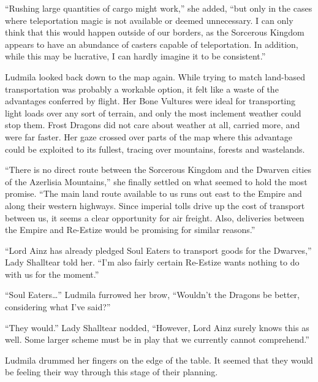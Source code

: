  

“Rushing large quantities of cargo might work,” she added, “but only in the cases where teleportation magic is not available or deemed unnecessary. I can only think that this would happen outside of our borders, as the Sorcerous Kingdom appears to have an abundance of casters capable of teleportation. In addition, while this may be lucrative, I can hardly imagine it to be consistent.”

 

Ludmila looked back down to the map again. While trying to match land-based transportation was probably a workable option, it felt like a waste of the advantages conferred by flight. Her Bone Vultures were ideal for transporting light loads over any sort of terrain, and only the most inclement weather could stop them. Frost Dragons did not care about weather at all, carried more, and were far faster. Her gaze crossed over parts of the map where this advantage could be exploited to its fullest, tracing over mountains, forests and wastelands.

 

“There is no direct route between the Sorcerous Kingdom and the Dwarven cities of the Azerlisia Mountains,” she finally settled on what seemed to hold the most promise. “The main land route available to us runs out east to the Empire and along their western highways. Since imperial tolls drive up the cost of transport between us, it seems a clear opportunity for air freight. Also, deliveries between the Empire and Re-Estize would be promising for similar reasons.”

 

“Lord Ainz has already pledged Soul Eaters to transport goods for the Dwarves,” Lady Shalltear told her. “I’m also fairly certain Re-Estize wants nothing to do with us for the moment.”

 

“Soul Eaters…” Ludmila furrowed her brow, “Wouldn’t the Dragons be better, considering what I’ve said?”

 

“They would.” Lady Shalltear nodded, “However, Lord Ainz surely knows this as well. Some larger scheme must be in play that we currently cannot comprehend.”

 

Ludmila drummed her fingers on the edge of the table. It seemed that they would be feeling their way through this stage of their planning.

 

